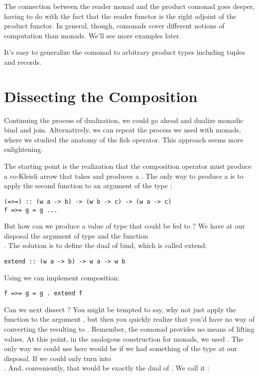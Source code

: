 The connection between the reader monad and the product comonad goes
deeper, having to do with the fact that the reader functor is the right
adjoint of the product functor. In general, though, comonads cover
different notions of computation than monads. We'll see more examples
later.

It's easy to generalize the  comonad to arbitrary
product types including tuples and records.

\section{Dissecting the Composition}

Continuing the process of dualization, we could go ahead and dualize
monadic bind and join. Alternatively, we can repeat the process we used
with monads, where we studied the anatomy of the fish operator. This
approach seems more enlightening.

The starting point is the realization that the composition operator must
produce a co-Kleisli arrow that takes  and produces a
. The only way to produce a  is to apply the second
function to an argument of the type :

\begin{Verbatim}
(=>=) :: (w a -> b) -> (w b -> c) -> (w a -> c)
f =>= g = g ... 
\end{Verbatim}
But how can we produce a value of type  that could be fed
to ? We have at our disposal the argument of type
 and the function\\ .
The solution is to define the dual of bind, which is called extend:

\begin{Verbatim}
extend :: (w a -> b) -> w a -> w b
\end{Verbatim}
Using  we can implement composition:

\begin{Verbatim}
f =>= g = g . extend f
\end{Verbatim}
Can we next dissect ? You might be tempted to say, why
not just apply the function  to the
argument , but then you quickly realize that you'd have no
way of converting the resulting  to . Remember,
the comonad provides no means of lifting values. At this point, in the
analogous construction for monads, we used . The only way
we could use  here would be if we had something of the type
 at our disposal. If we could only turn 
into\\ . And, conveniently, that would be exactly the
dual of . We call it :


